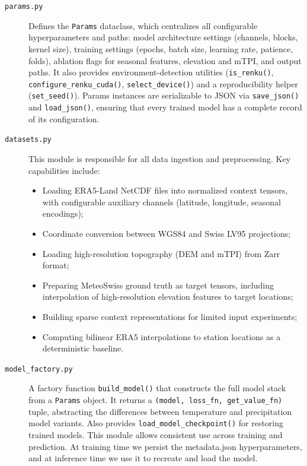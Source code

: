 \begin{description}

  \item[\texttt{params.py}]
  Defines the \texttt{Params} dataclass, which centralizes all configurable hyperparameters and paths: model architecture settings (channels, blocks, kernel size), training settings (epochs, batch size, learning rate, patience, folds), ablation flags for seasonal features, elevation and mTPI, and output paths.
  It also provides environment-detection utilities (\texttt{is\_renku()}, \texttt{configure\_renku\_cuda()}, \texttt{select\_device()}) and a reproducibility helper (\texttt{set\_seed()}).
  Params instances are serializable to JSON via \texttt{save\_json()} and \texttt{load\_json()}, ensuring that every trained model has a complete record of its configuration.

  \item[\texttt{datasets.py}]
  This module is responsible for all data ingestion and preprocessing.
  Key capabilities include:
  \begin{itemize}
    \item Loading ERA5-Land NetCDF files into normalized context tensors, with configurable auxiliary channels (latitude, longitude, seasonal encodings);
    \item Coordinate conversion between WGS84 and Swiss LV95 projections;
    \item Loading high-resolution topography (DEM and mTPI) from Zarr format;
    \item Preparing MeteoSwiss ground truth as target tensors, including interpolation of high-resolution elevation features to target locations;
    \item Building sparse context representations for limited input experiments;
    \item Computing bilinear ERA5 interpolations to station locations as a deterministic baseline.
  \end{itemize}

  \item[\texttt{model\_factory.py}]
  A factory function \texttt{build\_model()} that constructs the full model stack from a \texttt{Params} object. It returns a \texttt{(model, loss\_fn, get\_value\_fn)} tuple, abstracting the differences between temperature and precipitation model variants. Also provides \texttt{load\_model\_checkpoint()} for restoring trained models. This module allows consistent use across training and prediction. At training time we persist the metadata.json hyperparameters, and at inference time we use it to recreate and load the model. 


\end{description}
